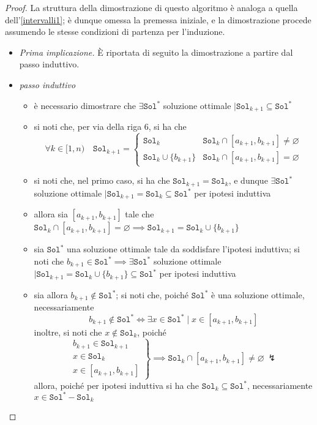 \documentclass[14pt]{extreport}
\theoremstyle{definition}
\theoremstyle{definition}
\begin{document}
\begin{proof}
    La struttura della dimostrazione di questo algoritmo è analoga a quella dell'\cref{intervalli1}; è dunque omessa la premessa iniziale, e la dimostrazione procede assumendo le stesse condizioni di partenza per l'induzione.

    \begin{itemize}
        \item[] \textit{Prima implicazione.} È riportata di seguito la dimostrazione a partire dal passo induttivo. 
        \item \textit{passo induttivo}
            \begin{itemize}
                \item è necessario dimostrare che $\exists \texttt{Sol}^*$ soluzione ottimale $\mid \texttt{Sol}_{k + 1} \subseteq \texttt{Sol}^*$
                \item si noti che, per via della riga 6, si ha che $$\forall k \in [1, n) \quad \texttt{Sol}_{k +1} = \left \{ \begin{array}{ll} \texttt{Sol}_k & \texttt{Sol}_k \cap [a_{k +1}, b_{k+1}] \neq \varnothing \\ \texttt{Sol}_k \cup \{b_{k +1}\} & \texttt{Sol}_k \cap [a_{k +1}, b_{k +1}] = \varnothing \end{array} \right.$$
                \item si noti che, nel primo caso, si ha che $\texttt{Sol}_{k +1} = \texttt{Sol}_k$, e dunque $\exists \texttt{Sol}^*$ soluzione ottimale $\mid \texttt{Sol}_{k +1} = \texttt{Sol}_k \subseteq \texttt{Sol}^*$ per ipotesi induttiva
                \item allora sia $[a_{k+1}, b_{k+1}]$ tale che $\texttt{Sol}_k \cap [a_{k+1}, b_{k +1}] = \varnothing \implies \texttt{Sol}_{k +1} = \texttt{Sol}_k \cup \{b_{k +1}\}$
                \item sia $\texttt{Sol}^*$ una soluzione ottimale tale da soddisfare l'ipotesi induttiva; si noti che $b_{k +1} \in \texttt{Sol}^* \implies \exists \texttt{Sol}^*$ soluzione ottimale $\mid \texttt{Sol}_{k +1} = \texttt{Sol}_k \cup \{ b_{k +1}\} \subseteq \texttt{Sol}^*$ per ipotesi induttiva
                \item sia allora $b_{k +1} \notin \texttt{Sol}^*$; si noti che, poiché $\texttt{Sol}^*$ è una soluzione ottimale, necessariamente $$b_{k +1} \notin \texttt{Sol}^* \iff \exists x \in \texttt{Sol}^*  \mid x \in [a_{k + 1}, b_{k +1}]$$ inoltre, si noti che $x \notin \texttt{Sol}_k$, poiché $$\left . \begin{array}{r} b_{k +1} \in \texttt{Sol}_{k +1} \\ x \in \texttt{Sol}_k \\ x \in [a_{k +1}, b_{ k+1}] \end{array} \right \} \implies \texttt{Sol}_k \cap [a_{k +1}, b_{k +1}] \neq \varnothing \ \lightning$$ allora, poiché per ipotesi induttiva si ha che $\texttt{Sol}_k \subseteq \texttt{Sol}^*$, necessariamente $x \in \texttt{Sol}^* - \texttt{Sol}_k$

\end{itemize}
\end{itemize}
\end{proof}
\end{document}
